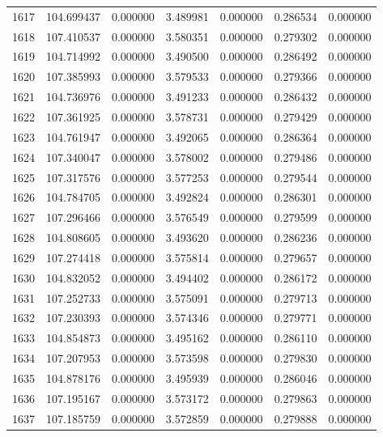 \begin{tabular}{rrrrrrr}
1617 & 104.699437 &    0.000000 &  3.489981 &   0.000000 &   0.286534 &  0.000000 \\
1618 & 107.410537 &    0.000000 &  3.580351 &   0.000000 &   0.279302 &  0.000000 \\
1619 & 104.714992 &    0.000000 &  3.490500 &   0.000000 &   0.286492 &  0.000000 \\
1620 & 107.385993 &    0.000000 &  3.579533 &   0.000000 &   0.279366 &  0.000000 \\
1621 & 104.736976 &    0.000000 &  3.491233 &   0.000000 &   0.286432 &  0.000000 \\
1622 & 107.361925 &    0.000000 &  3.578731 &   0.000000 &   0.279429 &  0.000000 \\
1623 & 104.761947 &    0.000000 &  3.492065 &   0.000000 &   0.286364 &  0.000000 \\
1624 & 107.340047 &    0.000000 &  3.578002 &   0.000000 &   0.279486 &  0.000000 \\
1625 & 107.317576 &    0.000000 &  3.577253 &   0.000000 &   0.279544 &  0.000000 \\
1626 & 104.784705 &    0.000000 &  3.492824 &   0.000000 &   0.286301 &  0.000000 \\
1627 & 107.296466 &    0.000000 &  3.576549 &   0.000000 &   0.279599 &  0.000000 \\
1628 & 104.808605 &    0.000000 &  3.493620 &   0.000000 &   0.286236 &  0.000000 \\
1629 & 107.274418 &    0.000000 &  3.575814 &   0.000000 &   0.279657 &  0.000000 \\
1630 & 104.832052 &    0.000000 &  3.494402 &   0.000000 &   0.286172 &  0.000000 \\
1631 & 107.252733 &    0.000000 &  3.575091 &   0.000000 &   0.279713 &  0.000000 \\
1632 & 107.230393 &    0.000000 &  3.574346 &   0.000000 &   0.279771 &  0.000000 \\
1633 & 104.854873 &    0.000000 &  3.495162 &   0.000000 &   0.286110 &  0.000000 \\
1634 & 107.207953 &    0.000000 &  3.573598 &   0.000000 &   0.279830 &  0.000000 \\
1635 & 104.878176 &    0.000000 &  3.495939 &   0.000000 &   0.286046 &  0.000000 \\
1636 & 107.195167 &    0.000000 &  3.573172 &   0.000000 &   0.279863 &  0.000000 \\
1637 & 107.185759 &    0.000000 &  3.572859 &   0.000000 &   0.279888 &  0.000000 \\

\end{tabular}
